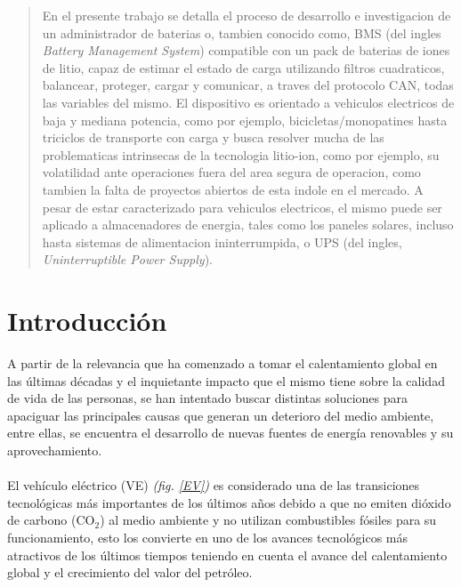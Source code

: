 \documentclass[10pt,a4paper]{article}
\begin{document}
    \begin{abstract}
        \noindent En el presente trabajo se detalla el proceso de desarrollo e
        investigacion de un administrador de baterias o, tambien conocido como,
        BMS (del ingles \emph{Battery Management System}) compatible con un pack
        de baterias de iones de litio, capaz de estimar el estado de carga 
        utilizando filtros cuadraticos, balancear, proteger, cargar y 
        comunicar, a traves del protocolo CAN, todas 
        las variables del mismo. El dispositivo es orientado a vehiculos 
        electricos de baja y mediana potencia, como por ejemplo, 
        bicicletas/monopatines hasta triciclos de transporte con carga
        y busca resolver mucha de las problematicas intrinsecas de 
        la tecnologia litio-ion, como por ejemplo, su volatilidad ante 
        operaciones fuera del area segura de operacion, 
        como tambien la falta de proyectos abiertos de esta indole en el mercado. 
        A pesar de estar caracterizado para vehiculos electricos, el mismo 
        puede ser aplicado a almacenadores de energia, tales como los paneles 
        solares, incluso hasta sistemas de alimentacion ininterrumpida, o UPS 
        (del ingles, \emph{Uninterruptible Power Supply}).
    \end{abstract}
	
    \clearpage

	\tableofcontents

    \clearpage

	\section{Introducción}
	
	\noindent A partir de la relevancia que ha comenzado a tomar el 
    calentamiento global en las últimas décadas y el inquietante impacto que 
    el mismo tiene sobre la calidad de vida de las personas, se han intentado 
    buscar distintas soluciones para apaciguar las principales causas que 
    generan un deterioro del medio ambiente, entre ellas, se encuentra el 
    desarrollo de nuevas fuentes de energía renovables y su aprovechamiento.\\ 
	\\
    \noindent El vehículo eléctrico (VE) \emph{(fig. \ref{EV})} es considerado 
    una de las transiciones tecnológicas más importantes de los últimos años 
    debido a que no emiten dióxido de carbono ($\mathrm{CO_2}$) al medio 
    ambiente y no utilizan combustibles fósiles para su funcionamiento, esto 
    los convierte en uno de los avances tecnológicos más atractivos de los 
    últimos tiempos teniendo en cuenta el avance del calentamiento global y el 
    crecimiento del valor del petróleo.
\end{document}
